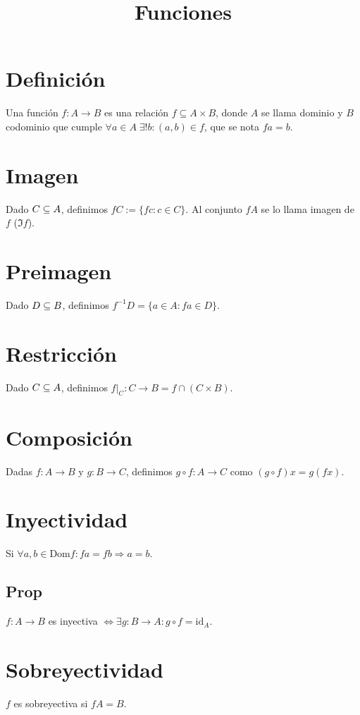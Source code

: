 \documentclass{article}
\title{Funciones}
\begin{document}
	\maketitle
	\section{Definición}
	Una función $f : A \to B$ es una relación $f \subseteq A \times B$, donde
	$A$ se llama dominio y $B$ codominio
	que cumple $\forall a \in A \; \exists ! b : (a, b) \in f$, que se nota $fa = b$.

	\section{Imagen}
	Dado $C \subseteq A$, definimos $f C := \{f c : c \in C\}$. Al conjunto $fA$ se lo llama
	imagen de $f$ ($\Im f$).

	\section{Preimagen}
	Dado $D \subseteq B$, definimos $f^{-1}D = \{a \in A : fa \in D \}$.

	\section{Restricción}
	Dado $C \subseteq A$, definimos $f |_C : C \to B = f \cap (C \times B)$.

	\section{Composición}
	Dadas $f : A \to B$ y $g : B \to C$, definimos $g \circ f : A \to C$ como
	$(g \circ f) x = g (fx)$.

	\section{Inyectividad}
	Si $\forall a, b \in \text{Dom} f :  fa = fb \Rightarrow a = b$.

	\subsection{Prop}
	$f : A \to B$ es inyectiva $\iff \exists g : B \to A : g \circ f = \text{id}_A$.

	\section{Sobreyectividad}
	$f$ es sobreyectiva si $f A = B$.
\end{document}
